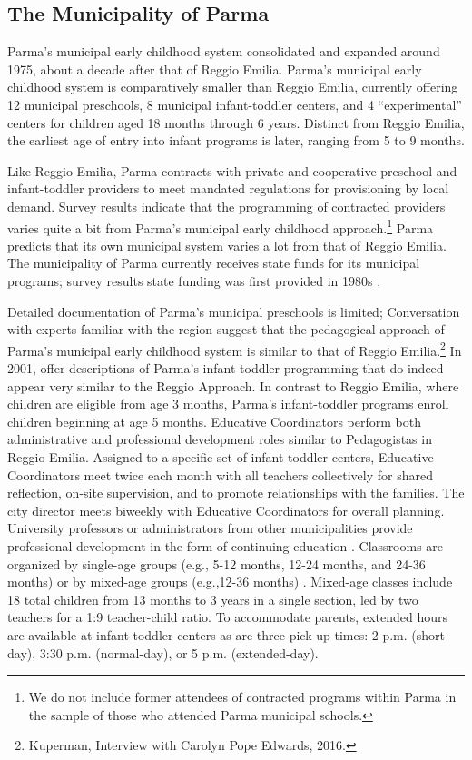 \subsection{The Municipality of Parma}

Parma's municipal early childhood system consolidated and expanded around 1975, about a decade after that of Reggio Emilia. Parma's municipal early childhood system is comparatively smaller than Reggio Emilia, currently offering 12 municipal preschools, 8 municipal infant-toddler centers, and 4 ``experimental'' centers for children aged 18 months through 6 years. Distinct from Reggio Emilia, the earliest age of entry into infant programs is later, ranging from 5 to 9 months. 

Like Reggio Emilia, Parma contracts with private and cooperative preschool and infant-toddler providers to meet mandated regulations for provisioning by local demand. Survey results indicate that the programming of contracted providers varies quite a bit from Parma's municipal early childhood approach.\footnote{We do not include former attendees of contracted programs within Parma in the sample of those who attended Parma municipal schools.} Parma predicts that its own municipal system varies a lot from that of Reggio Emilia. The municipality of Parma currently receives state funds for its municipal programs; survey results state funding was first provided in 1980s \citep{CEHD_2016_Historical-Analysis}.

Detailed documentation of Parma's municipal preschools is limited; Conversation with experts familiar with the region suggest that the pedagogical approach of Parma's municipal early childhood system is similar to that of Reggio Emilia.\footnote{Kuperman, Interview with Carolyn Pope Edwards, 2016.} In 2001,\citet{Terzi-Cantarelli_2001_Parma} offer descriptions of Parma's infant-toddler programming that do indeed appear very similar to the Reggio Approach. In contrast to Reggio Emilia, where children are eligible from age 3 months, Parma's infant-toddler programs enroll children beginning at age 5 months. Educative Coordinators perform both administrative and professional development roles similar to Pedagogistas in Reggio Emilia. Assigned to a specific set of infant-toddler centers, Educative Coordinators meet twice each month with all teachers collectively for shared reflection, on-site supervision, and to promote relationships with the families. The city director meets biweekly with Educative Coordinators for overall planning. University professors or administrators from other municipalities provide professional development in the form of continuing education \citep{Terzi-Cantarelli_2001_Parma}. Classrooms are organized by single-age groups (e.g., 5-12 months, 12-24 months, and 24-36 months) or by mixed-age groups (e.g.,12-36 months) \citep{Majorano-etal_2009_CC-in-P}. Mixed-age classes include 18 total children from 13 months to 3 years in a single section, led by two teachers for a 1:9 teacher-child ratio. To accommodate parents, extended hours are available at infant-toddler centers as are three pick-up times: 2 p.m. (short-day), 3:30 p.m. (normal-day), or 5 p.m. (extended-day).

